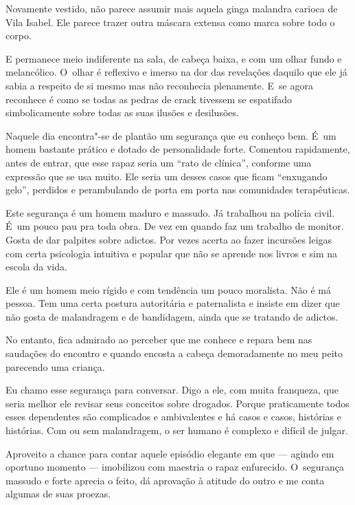 Novamente vestido,  não parece assumir mais aquela ginga malandra
carioca de Vila Isabel. Ele parece trazer outra máscara extensa como
marca sobre todo o corpo.

E permanece meio indiferente na sala, de cabeça baixa, e com um olhar
fundo e melancólico. O~olhar é reflexivo e imerso na dor das revelações
daquilo que ele já sabia a respeito de si mesmo mas não reconhecia
plenamente. E~se agora reconhece é como se todas as pedras de crack
tivessem se espatifado simbolicamente sobre todas as suas ilusões e
desilusões.

\asterisc{}

Naquele dia encontra"-se de plantão um segurança que eu conheço bem. É~um
homem bastante prático e dotado de personalidade forte. Comentou
rapidamente, antes de  entrar, que esse rapaz seria um ``rato de
clínica'', conforme uma expressão que se usa muito. Ele seria um desses
casos que ficam ``enxugando gelo'', perdidos e perambulando de porta em
porta nas comunidades terapêuticas.

Este segurança é um homem maduro e massudo. Já trabalhou na polícia
civil. É~um pouco pau pra toda obra. De vez em quando faz um trabalho de
monitor. Gosta de dar palpites sobre adictos. Por vezes acerta ao fazer
incursões leigas com certa psicologia intuitiva e popular que não se
aprende nos livros e sim na escola da vida.

Ele é um homem meio rígido e com tendência um pouco moralista. Não é má
pessoa. Tem uma certa postura autoritária e paternalista e insiste em
dizer que não gosta de malandragem e de bandidagem, ainda que se
tratando de adictos.

No entanto, fica admirado ao perceber que  me conhece e repara bem nas
saudações do encontro e quando  encosta a cabeça demoradamente no meu
peito parecendo uma criança.

Eu chamo esse segurança para conversar. Digo a ele, com muita franqueza,
que seria melhor ele revisar seus conceitos sobre drogados. Porque
praticamente todos esses dependentes são complicados e ambivalentes e há
casos e casos, histórias e histórias. Com ou sem malandragem, o ser humano
é complexo e difícil de julgar.

Aproveito a chance para contar aquele episódio elegante em que  ---
agindo em oportuno momento --- imobilizou com maestria o rapaz
enfurecido. O~segurança massudo e forte aprecia o feito, dá aprovação à
atitude do outro e me conta algumas de suas proezas.

